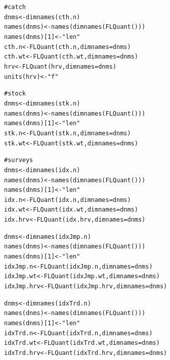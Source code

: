 \documentclass[a4paper,english,10pt]{article}\usepackage[]{graphicx}\usepackage[]{color}
\makeatletter
\newcommand{\hlnum}[1]{\textcolor[rgb]{0.2,0.2,0.2}{#1}}%
\newcommand{\hlstr}[1]{\textcolor[rgb]{0.2,0.2,0.2}{#1}}%
\newcommand{\hlcom}[1]{\textcolor[rgb]{0.2,0.267,0.4}{#1}}%
\newcommand{\hlstd}[1]{\textcolor[rgb]{0,0,0}{#1}}%
\newcommand{\hlkwb}[1]{\textcolor[rgb]{0.361,0.506,0.596}{#1}}%
\newcommand{\hlkwc}[1]{\textcolor[rgb]{0.361,0.506,0.596}{#1}}%
\newcommand{\hlkwd}[1]{\textcolor[rgb]{0.361,0.506,0.596}{#1}}%
\newenvironment{kframe}{%
 \def\at@end@of@kframe{}%
 \ifinner\ifhmode%
  \def\at@end@of@kframe{\end{minipage}}%
  \begin{minipage}{\columnwidth}%
 \fi\fi%
 \def\FrameCommand##1{\hskip\@totalleftmargin \hskip-\fboxsep
 \colorbox{shadecolor}{##1}\hskip-\fboxsep
     \hskip-\linewidth \hskip-\@totalleftmargin \hskip\columnwidth}%
 \MakeFramed {\advance\hsize-\width
   \@totalleftmargin\z@ \linewidth\hsize
   \@setminipage}}%
 {\par\unskip\endMakeFramed%
 \at@end@of@kframe}
\newenvironment{knitrout}{}{} %
\makeatother
\begin{document}
\begin{knitrout}
\color{fgcolor}\begin{kframe}
\begin{alltt}
\hlcom{# catch}
\hlstd{dnms} \hlkwb{<-} \hlkwd{dimnames}\hlstd{(cth.n)}
\hlkwd{names}\hlstd{(dnms)} \hlkwb{<-} \hlkwd{names}\hlstd{(}\hlkwd{dimnames}\hlstd{(}\hlkwd{FLQuant}\hlstd{()))}
\hlkwd{names}\hlstd{(dnms)[}\hlnum{1}\hlstd{]} \hlkwb{<-} \hlstr{"len"}
\hlstd{cth.n} \hlkwb{<-} \hlkwd{FLQuant}\hlstd{(cth.n,} \hlkwc{dimnames} \hlstd{= dnms)}
\hlstd{cth.wt} \hlkwb{<-} \hlkwd{FLQuant}\hlstd{(cth.wt,} \hlkwc{dimnames} \hlstd{= dnms)}
\hlstd{hrv} \hlkwb{<-} \hlkwd{FLQuant}\hlstd{(hrv,} \hlkwc{dimnames} \hlstd{= dnms)}
\hlkwd{units}\hlstd{(hrv)} \hlkwb{<-} \hlstr{"f"}

\hlcom{# stock}
\hlstd{dnms} \hlkwb{<-} \hlkwd{dimnames}\hlstd{(stk.n)}
\hlkwd{names}\hlstd{(dnms)} \hlkwb{<-} \hlkwd{names}\hlstd{(}\hlkwd{dimnames}\hlstd{(}\hlkwd{FLQuant}\hlstd{()))}
\hlkwd{names}\hlstd{(dnms)[}\hlnum{1}\hlstd{]} \hlkwb{<-} \hlstr{"len"}
\hlstd{stk.n} \hlkwb{<-} \hlkwd{FLQuant}\hlstd{(stk.n,} \hlkwc{dimnames} \hlstd{= dnms)}
\hlstd{stk.wt} \hlkwb{<-} \hlkwd{FLQuant}\hlstd{(stk.wt,} \hlkwc{dimnames} \hlstd{= dnms)}

\hlcom{# surveys}
\hlstd{dnms} \hlkwb{<-} \hlkwd{dimnames}\hlstd{(idx.n)}
\hlkwd{names}\hlstd{(dnms)} \hlkwb{<-} \hlkwd{names}\hlstd{(}\hlkwd{dimnames}\hlstd{(}\hlkwd{FLQuant}\hlstd{()))}
\hlkwd{names}\hlstd{(dnms)[}\hlnum{1}\hlstd{]} \hlkwb{<-} \hlstr{"len"}
\hlstd{idx.n} \hlkwb{<-} \hlkwd{FLQuant}\hlstd{(idx.n,} \hlkwc{dimnames} \hlstd{= dnms)}
\hlstd{idx.wt} \hlkwb{<-} \hlkwd{FLQuant}\hlstd{(idx.wt,} \hlkwc{dimnames} \hlstd{= dnms)}
\hlstd{idx.hrv} \hlkwb{<-} \hlkwd{FLQuant}\hlstd{(idx.hrv,} \hlkwc{dimnames} \hlstd{= dnms)}

\hlstd{dnms} \hlkwb{<-} \hlkwd{dimnames}\hlstd{(idxJmp.n)}
\hlkwd{names}\hlstd{(dnms)} \hlkwb{<-} \hlkwd{names}\hlstd{(}\hlkwd{dimnames}\hlstd{(}\hlkwd{FLQuant}\hlstd{()))}
\hlkwd{names}\hlstd{(dnms)[}\hlnum{1}\hlstd{]} \hlkwb{<-} \hlstr{"len"}
\hlstd{idxJmp.n} \hlkwb{<-} \hlkwd{FLQuant}\hlstd{(idxJmp.n,} \hlkwc{dimnames} \hlstd{= dnms)}
\hlstd{idxJmp.wt} \hlkwb{<-} \hlkwd{FLQuant}\hlstd{(idxJmp.wt,} \hlkwc{dimnames} \hlstd{= dnms)}
\hlstd{idxJmp.hrv} \hlkwb{<-} \hlkwd{FLQuant}\hlstd{(idxJmp.hrv,} \hlkwc{dimnames} \hlstd{= dnms)}

\hlstd{dnms} \hlkwb{<-} \hlkwd{dimnames}\hlstd{(idxTrd.n)}
\hlkwd{names}\hlstd{(dnms)} \hlkwb{<-} \hlkwd{names}\hlstd{(}\hlkwd{dimnames}\hlstd{(}\hlkwd{FLQuant}\hlstd{()))}
\hlkwd{names}\hlstd{(dnms)[}\hlnum{1}\hlstd{]} \hlkwb{<-} \hlstr{"len"}
\hlstd{idxTrd.n} \hlkwb{<-} \hlkwd{FLQuant}\hlstd{(idxTrd.n,} \hlkwc{dimnames} \hlstd{= dnms)}
\hlstd{idxTrd.wt} \hlkwb{<-} \hlkwd{FLQuant}\hlstd{(idxTrd.wt,} \hlkwc{dimnames} \hlstd{= dnms)}
\hlstd{idxTrd.hrv} \hlkwb{<-} \hlkwd{FLQuant}\hlstd{(idxTrd.hrv,} \hlkwc{dimnames} \hlstd{= dnms)}
\end{alltt}
\end{kframe}
\end{knitrout}
\end{document}
